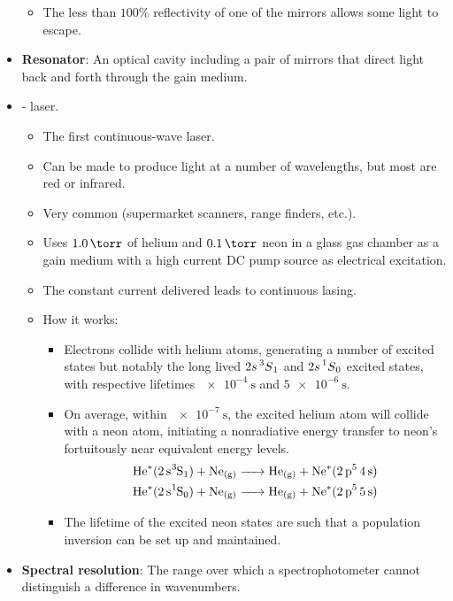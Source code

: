 \documentclass[../notes.tex]{subfiles}
\begin{document}
\begin{itemize}
\begin{itemize}
        \item The less than $100\%$ reflectivity of one of the mirrors allows some light to escape.
    \end{itemize}
    \item \textbf{Resonator}: An optical cavity including a pair of mirrors that direct light back and forth through the gain medium.
    \item {}- laser.
    \begin{itemize}
        \item The first continuous-wave laser.
        \item Can be made to produce light at a number of wavelengths, but most are red or infrared.
        \item Very common (supermarket scanners, range finders, etc.).
        \item Uses $\SI{1.0}{\torr}$ of helium and $\SI{0.1}{\torr}$ neon in a glass gas chamber as a gain medium with a high current DC pump source as electrical excitation.
        \item The constant current delivered leads to continuous lasing.
        \item How it works:
        \begin{itemize}
            \item Electrons collide with helium atoms, generating a number of excited states but notably the long lived $2s\prescript{3}{}{S}_1$ and $2s\prescript{1}{}{S}_0$ excited states, with respective lifetimes $\SI{e-4}{\second}$ and $\SI{5e-6}{\second}$.
            \item On average, within $\SI{e-7}{\second}$, the excited helium atom will collide with a neon atom, initiating a nonradiative energy transfer to neon's fortuitously near equivalent energy levels.
            \begin{gather*}
                \ce{He^{$*$}(2s{}^3S1) + Ne_{(g)} -> He_{(g)} + Ne^{$*$}(2p^5 4s)}\\
                \ce{He^{$*$}(2s{}^1S0) + Ne_{(g)} -> He_{(g)} + Ne^{$*$}(2p^5 5s)}
            \end{gather*}
            \item The lifetime of the excited neon states are such that a population inversion can be set up and maintained.
        \end{itemize}
    \end{itemize}
    \item \textbf{Spectral resolution}: The range over which a spectrophotometer cannot distinguish a difference in wavenumbers.

\end{itemize}
\end{document}
